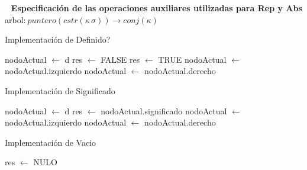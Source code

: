 \begin{Representacion}
$\ $\newline$\ $
\newline \indent \textbf{Especificaci\'on de las operaciones auxiliares utilizadas para Rep y Abs}
\newline \indent arbol:$\ puntero(estr(\kappa\, \sigma)) \rightarrow conj(\kappa)$


\end{Representacion}

\newpage

\begin{Algoritmos}

\begin{algorithm}
\caption{Implementaci\'on de Definido?}
\begin{algorithmic}[0]
	\State nodoActual $\gets$ d
	\State res $\gets$ FALSE
			\State res $\gets$ TRUE
		\Else
				\State nodoActual $\gets$ nodoActual.izquierdo
			\Else
				\State nodoActual $\gets$ nodoActual.derecho
			\EndIf
		\EndIf
	\EndWhile
\EndFunction
\end{algorithmic}
\end{algorithm}

\begin{algorithm}
\caption{Implementaci\'on de Significado}
\begin{algorithmic}[0]
	\State nodoActual $\gets$ d
			\State res $\gets$ nodoActual.significado
		\Else
				\State nodoActual $\gets$ nodoActual.izquierdo
			\Else
				\State nodoActual $\gets$ nodoActual.derecho
			\EndIf
		\EndIf
	\EndWhile
\EndFunction
\end{algorithmic}
\end{algorithm}

\begin{algorithm}
\caption{Implementaci\'on de Vacio}
\begin{algorithmic}[0]
	\State res $\gets$ NULO
\EndFunction
\end{algorithmic}
\end{algorithm}


\end{Algoritmos}
